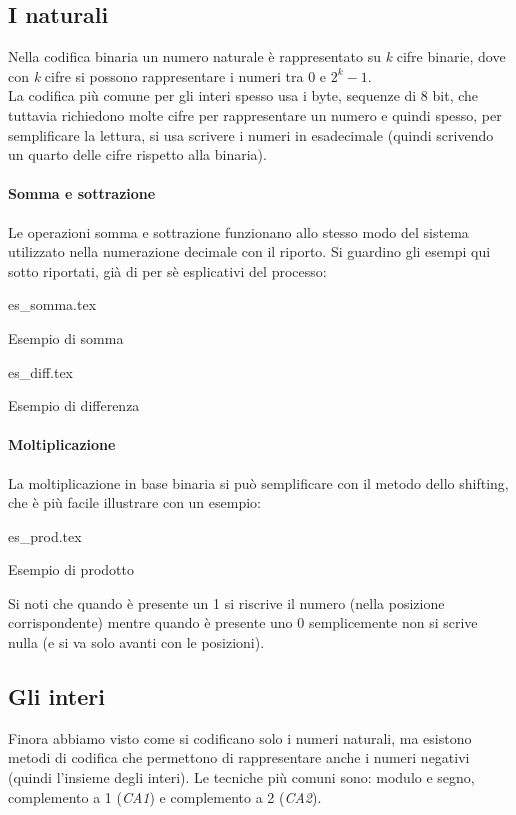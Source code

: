 \documentclass[class=book, crop=false]{standalone}
\begin{document}
\subsection{I naturali} Nella codifica binaria un numero naturale è rappresentato su \emph{k} cifre binarie, dove con \emph{k} cifre si possono rappresentare i numeri tra 0 e $2^{k}-1$.\\
La codifica più comune per gli interi spesso usa i byte, sequenze di 8 bit, che tuttavia richiedono molte cifre per rappresentare un numero e quindi spesso, per semplificare la lettura, si usa scrivere i numeri in esadecimale (quindi scrivendo un quarto delle cifre rispetto alla binaria).

\paragraph*{Somma e sottrazione}
Le operazioni somma e sottrazione funzionano allo stesso modo del sistema utilizzato nella numerazione decimale con il riporto. Si guardino gli esempi qui sotto riportati, già di per sè esplicativi del processo:\\

\begin{table}[H]
	\centering
	{es_somma.tex}
	\caption{Esempio di somma}
\end{table}

\begin{table}[H]
	\centering
	{es_diff.tex}
	\caption{Esempio di differenza}
\end{table}

\paragraph*{Moltiplicazione} La moltiplicazione in base binaria si può semplificare con il metodo dello shifting, che è più facile illustrare con un esempio:
\begin{table}[H]
	\centering
	{es_prod.tex}
	\caption{Esempio di prodotto}
\end{table}
Si noti che quando è presente un 1 si riscrive il numero (nella posizione corrispondente) mentre  quando è presente uno 0 semplicemente non si scrive nulla (e si va solo avanti con le posizioni).

\subsection{Gli interi} Finora abbiamo visto come si codificano solo i numeri naturali, ma esistono metodi di codifica che permettono di rappresentare anche i numeri negativi (quindi l’insieme degli interi). Le tecniche più comuni sono: modulo e segno, complemento a 1 (\emph{CA1}) e complemento a 2 (\emph{CA2}).
\end{document}
